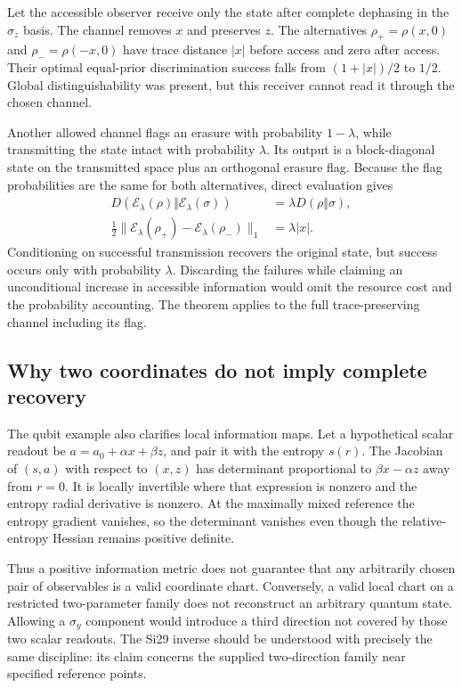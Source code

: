 Let the accessible observer receive only the state after complete dephasing in the $\sigma_z$ basis. The channel removes $x$ and preserves $z$. The alternatives $\rho_+=\rho(x,0)$ and $\rho_-=\rho(-x,0)$ have trace distance $|x|$ before access and zero after access. Their optimal equal-prior discrimination success falls from $(1+|x|)/2$ to $1/2$. Global distinguishability was present, but this receiver cannot read it through the chosen channel.

Another allowed channel flags an erasure with probability $1-\lambda$, while transmitting the state intact with probability $\lambda$. Its output is a block-diagonal state on the transmitted space plus an orthogonal erasure flag. Because the flag probabilities are the same for both alternatives, direct evaluation gives
\begin{equation}
 \begin{aligned}
 D(\mathcal E_\lambda(\rho)\Vert\mathcal E_\lambda(\sigma))
 &=\lambda D(\rho\Vert\sigma),\\
 \tfrac12\|\mathcal E_\lambda(\rho_+)-\mathcal E_\lambda(\rho_-)\|_1
 &=\lambda|x|.
 \end{aligned}
 \label{c7:erasure}
\end{equation}
Conditioning on successful transmission recovers the original state, but success occurs only with probability $\lambda$. Discarding the failures while claiming an unconditional increase in accessible information would omit the resource cost and the probability accounting. The theorem applies to the full trace-preserving channel including its flag.

\subsection{Why two coordinates do not imply complete recovery}
The qubit example also clarifies local information maps. Let a hypothetical scalar readout be $a=a_0+\alpha x+\beta z$, and pair it with the entropy $s(r)$. The Jacobian of $(s,a)$ with respect to $(x,z)$ has determinant proportional to $\beta x-\alpha z$ away from $r=0$. It is locally invertible where that expression is nonzero and the entropy radial derivative is nonzero. At the maximally mixed reference the entropy gradient vanishes, so the determinant vanishes even though the relative-entropy Hessian remains positive definite.

Thus a positive information metric does not guarantee that any arbitrarily chosen pair of observables is a valid coordinate chart. Conversely, a valid local chart on a restricted two-parameter family does not reconstruct an arbitrary quantum state. Allowing a $\sigma_y$ component would introduce a third direction not covered by those two scalar readouts. The Si29 inverse should be understood with precisely the same discipline: its claim concerns the supplied two-direction family near specified reference points.

